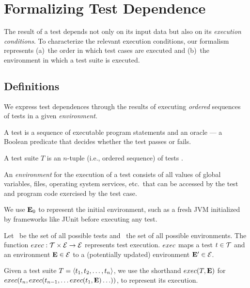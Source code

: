 
\section{Formalizing Test Dependence}
\label{sec:formalism}


The result of a test depends not only on
its input data but also on its \emph{execution conditions}.
To characterize the relevant execution conditions, 
our formalism represents
(a)~the order in which test cases are executed and (b)~the environment in which a test suite is executed.  


\subsection{Definitions}
\label{sec:definitions}

We express test dependences through the results of executing
\emph{ordered} sequences of tests in a given \emph{environment}.


\begin{definition}[Test]

A test is a sequence of executable program statements and an oracle
--- a Boolean predicate that
decides whether the test passes or fails.
\end{definition}


\begin{definition}
A test suite\/ $T$ is an $n$-tuple (i.e., ordered sequence) of tests
.

\end{definition}


\begin{definition}[Environment]
An \emph{environment} \env for the execution of a test
consists of all values of global variables, files,
operating
system services, etc.\ that
can be accessed by the test and program code exercised by the test
case.
\end{definition}

We use $\mathbf{E}_0$ to represent the initial environment, such
as a fresh JVM initialized by frameworks like JUnit
before executing any test.


\begin{definition}
Let\/ \alltests\ be the set of all possible
tests and\/ \environs\ the set of all possible
environments.
The function\/ $exec: \mathcal{T} \times \mathcal{E} \rightarrow
\mathcal{E}$ represents test
execution. $exec$ maps a test\/ $ t \in
\mathcal{T}$ 
and an environment\/ $\mathbf{E} \in \mathcal{E}$ to a (potentially updated)
environment\/ $\mathbf{E}' \in \mathcal{E}$.

Given a test suite\/ $T =  \langle t_1, t_2, \dots, t_n \rangle $,
we use the shorthand\/
$exec(T,\mathbf{E})$ for $exec(t_n,exec(t_{n-1},{\dots exec(t_1,\mathbf{E}) \dots }))$, to represent its execution.
\end{definition}

